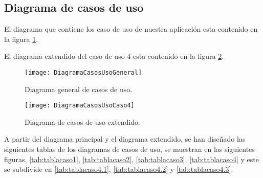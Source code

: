 \subsection{Diagrama de casos de uso}
El diagrama que contiene los caso de uso de nuestra aplicación esta contenido en la figura \ref{fig:diagramCasosUso}.	

El diagrama extendido del caso de uso 4 esta contenido en la figura \ref{fig:diagramCasosUso4}.


\begin{figure}[h]
\centering
\texttt{[image: DiagramaCasosUsoGeneral]}
\caption{Diagrama general de casos de uso.}
\label{fig:diagramCasosUso}
\end{figure}

\begin{figure}[h]
\centering
\texttt{[image: DiagramaCasosUsoCaso4]}
\caption{Diagrama de casos de uso extendido.}
\label{fig:diagramCasosUso4}
\end{figure}
 
A partir del diagrama principal y el diagrama extendido, se han diseñado las siguientes tablas de los diagramas de casos de uso, se muestran en las siguientes figuras, \ref{tab:tablacaso1}, \ref{tab:tablacaso2}, \ref{tab:tablacaso3}, \ref{tab:tablacaso4} y este se subdivide en \ref{tab:tablacaso4.1}, \ref{tab:tablacaso4.2} y \ref{tab:tablacaso4.3}.

